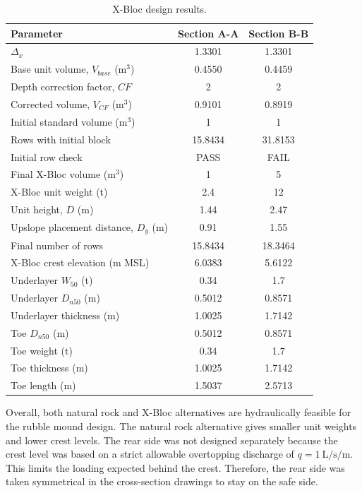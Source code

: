 \documentclass[a4paper, 11pt]{article}
\begin{document}
\begin{table}[H]
\centering
\caption{X-Bloc design results.}
\label{tab:rmbw_xbloc}
\begin{tabular}{l c c}
\hline
Parameter & Section A-A & Section B-B \\
\hline
\(\Delta_x\) & 1.3301 & 1.3301 \\
Base unit volume, \(V_{base}\) (m\(^3\)) & 0.4550 & 0.4459 \\
Depth correction factor, \(CF\) & 2 & 2 \\
Corrected volume, \(V_{CF}\) (m\(^3\)) & 0.9101 & 0.8919 \\
Initial standard volume (m\(^3\)) & 1 & 1 \\
Rows with initial block & 15.8434 & 31.8153 \\
Initial row check & PASS & FAIL \\
Final X-Bloc volume (m\(^3\)) & 1 & 5 \\
X-Bloc unit weight (t) & 2.4 & 12 \\
Unit height, \(D\) (m) & 1.44 & 2.47 \\
Upslope placement distance, \(D_y\) (m) & 0.91 & 1.55 \\
Final number of rows & 15.8434 & 18.3464 \\
X-Bloc crest elevation (m MSL) & 6.0383 & 5.6122 \\
Underlayer \(W_{50}\) (t) & 0.34 & 1.7 \\
Underlayer \(D_{n50}\) (m) & 0.5012 & 0.8571 \\
Underlayer thickness (m) & 1.0025 & 1.7142 \\
Toe \(D_{n50}\) (m) & 0.5012 & 0.8571 \\
Toe weight (t) & 0.34 & 1.7 \\
Toe thickness (m) & 1.0025 & 1.7142 \\
Toe length (m) & 1.5037 & 2.5713 \\
\hline
\end{tabular}
\end{table}

Overall, both natural rock and X-Bloc alternatives are hydraulically feasible for the rubble mound design. The natural rock alternative gives smaller unit weights and lower crest levels. The rear side was not designed separately because the crest level was based on a strict allowable overtopping discharge of \(q=1~\mathrm{L/s/m}\). This limits the loading expected behind the crest. Therefore, the rear side was taken symmetrical in the cross-section drawings to stay on the safe side.
\end{document}
